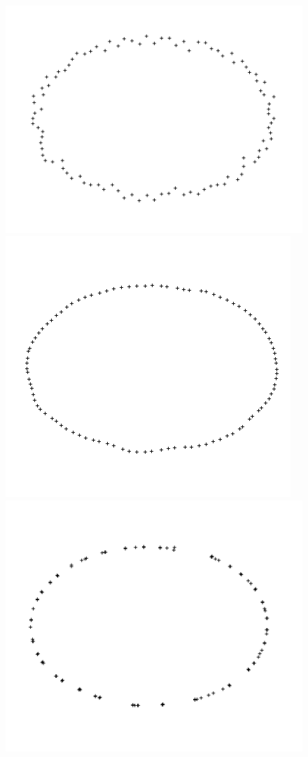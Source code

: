 \documentclass{beamer}
\begin{document}
\begin{frame}[allowframebreaks]
    \begin{figure}
        \centering
        \includegraphics[scale=0.18]{img/ellipse-area-sparse-0}
        \includegraphics[scale=0.18]{img/ellipse-area-sparse-10}
        \includegraphics[scale=0.18]{img/ellipse-area-sparse-50}

\end{figure}
\end{frame}
\end{document}
